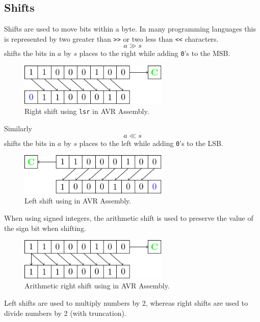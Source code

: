 \documentclass[a4paper]{report}
\newcommand{\keyword}[1]{\textcolor[rgb]{0.00,0.50,0.00}{\textbf{#1}}}
\begin{document}
\subsection{Shifts}
Shifts are used to move bits within a byte. In many programming languages this is represented by two greater than \texttt{>>} or two less than \texttt{<<} characters.
\begin{equation*}
    a \gg s
\end{equation*}
shifts the bits in \(a\) by \(s\) places to the right while adding \texttt{0}'s to the MSB.\
\begin{figure}[H]
    \centering
    \includegraphics[height = 2cm, keepaspectratio = true]{figures/logical_right_shift.pdf}
    \caption{Right shift using \texttt{lsr} in AVR Assembly.} %
\end{figure}
Similarly
\begin{equation*}
    a \ll s
\end{equation*}
shifts the bits in \(a\) by \(s\) places to the left while adding \texttt{0}'s to the LSB.\
\begin{figure}[H]
    \centering
    \includegraphics[height = 2cm, keepaspectratio = true]{figures/logical_left_shift.pdf}
    \caption{Left shift using \keyword{} in AVR Assembly.} %
\end{figure}
When using signed integers, the arithmetic shift is used to preserve the value of the sign bit when shifting.
\begin{figure}[H]
    \centering
    \includegraphics[height = 2cm, keepaspectratio = true]{figures/arithmetic_right_shift.pdf}
    \caption{Arithmetic right shift using \keyword{} in AVR Assembly.} %
\end{figure}
Left shifts are used to multiply numbers by 2, whereas right shifts are used to divide numbers by 2 (with truncation).
\end{document}
